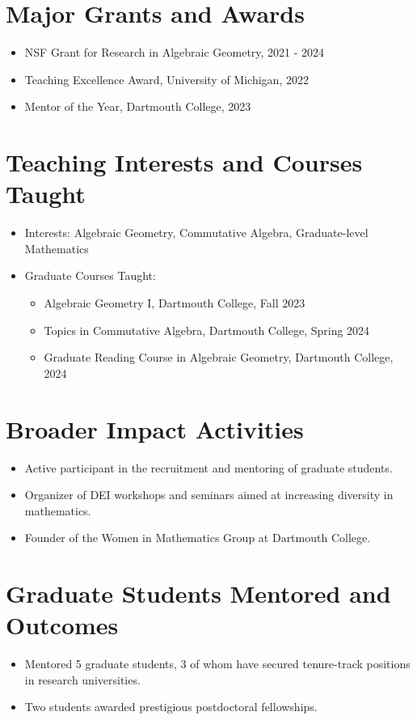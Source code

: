\documentclass[letterpaper,11pt]{article}
\begin{document}
\section*{Major Grants and Awards}
\begin{itemize}
    \item NSF Grant for Research in Algebraic Geometry, 2021 - 2024
    \item Teaching Excellence Award, University of Michigan, 2022
    \item Mentor of the Year, Dartmouth College, 2023
\end{itemize}

\section*{Teaching Interests and Courses Taught}
\begin{itemize}
    \item Interests: Algebraic Geometry, Commutative Algebra, Graduate-level Mathematics
    \item Graduate Courses Taught:
        \begin{itemize}
            \item Algebraic Geometry I, Dartmouth College, Fall 2023
            \item Topics in Commutative Algebra, Dartmouth College, Spring 2024
            \item Graduate Reading Course in Algebraic Geometry, Dartmouth College, 2024
        \end{itemize}
\end{itemize}

\section*{Broader Impact Activities}
\begin{itemize}
    \item Active participant in the recruitment and mentoring of graduate students.
    \item Organizer of DEI workshops and seminars aimed at increasing diversity in mathematics.
    \item Founder of the Women in Mathematics Group at Dartmouth College.
\end{itemize}

\section*{Graduate Students Mentored and Outcomes}
\begin{itemize}
    \item Mentored 5 graduate students, 3 of whom have secured tenure-track positions in research universities.
    \item Two students awarded prestigious postdoctoral fellowships.
\end{itemize}
\end{document}
